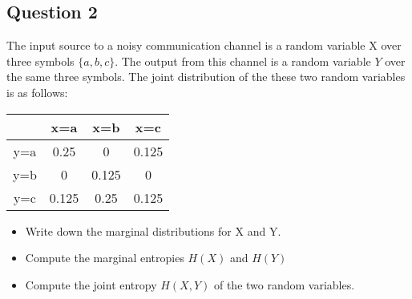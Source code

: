\documentclass[a4paper,12pt]{article}
\begin{document}
\subsection*{Question 2}

The input source to a noisy communication channel is a random variable X over three symbols $\{a,b,c\}$. The output from this channel is a random variable $Y$ over the same three symbols. The joint distribution of the these two random variables is as follows:

\begin{center}
\begin{tabular}{|c|c|c|c|}
\hline
	&	x=a	&	x=b	&	x=c	\\ \hline
y=a	&	0.25	&	0	&	0.125	\\ \hline
y=b	&	0	&	0.125	&	0	\\ \hline
y=c	&	0.125	&	0.25	&	0.125	\\ \hline
\end{tabular} 
\end{center}

\begin{itemize}
\item Write down the marginal distributions for X and Y.

\item Compute the marginal entropies $H(X)$ and $H(Y)$

\item Compute the joint entropy $H(X,Y)$ of the two random variables.
\end{itemize}
\newpage
\end{document}
